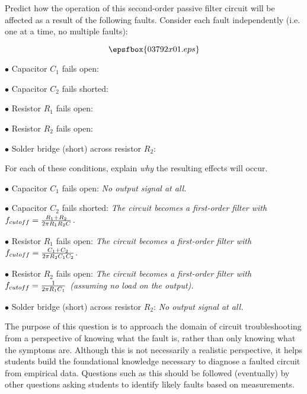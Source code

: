 

Predict how the operation of this second-order passive filter circuit will be affected as a result of the following faults.  Consider each fault independently (i.e. one at a time, no multiple faults):

$$\epsfbox{03792x01.eps}$$

\medskip
\item{$\bullet$} Capacitor $C_1$ fails open:
\vskip 5pt
\item{$\bullet$} Capacitor $C_2$ fails shorted:
\vskip 5pt
\item{$\bullet$} Resistor $R_1$ fails open:
\vskip 5pt
\item{$\bullet$} Resistor $R_2$ fails open:
\vskip 5pt
\item{$\bullet$} Solder bridge (short) across resistor $R_2$:
\medskip

For each of these conditions, explain {\it why} the resulting effects will occur.







\medskip
\item{$\bullet$} Capacitor $C_1$ fails open: {\it No output signal at all.}
\vskip 5pt
\item{$\bullet$} Capacitor $C_2$ fails shorted: {\it The circuit becomes a first-order filter with $f_{cutoff} = {{R_1 + R_2} \over {2 \pi R_1 R_2 C}}$.}
\vskip 5pt
\item{$\bullet$} Resistor $R_1$ fails open: {\it The circuit becomes a first-order filter with $f_{cutoff} = {{C_1 + C_2} \over {2 \pi R_2 C_1 C_2}}$.}
\vskip 5pt
\item{$\bullet$} Resistor $R_2$ fails open: {\it The circuit becomes a first-order filter with $f_{cutoff} = {1 \over {2 \pi R_1 C_1}}$ (assuming no load on the output).}
\vskip 5pt
\item{$\bullet$} Solder bridge (short) across resistor $R_2$: {\it No output signal at all.}
\medskip







The purpose of this question is to approach the domain of circuit troubleshooting from a perspective of knowing what the fault is, rather than only knowing what the symptoms are.  Although this is not necessarily a realistic perspective, it helps students build the foundational knowledge necessary to diagnose a faulted circuit from empirical data.  Questions such as this should be followed (eventually) by other questions asking students to identify likely faults based on measurements.




